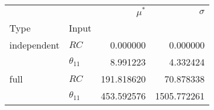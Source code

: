 \begin{tabular}{llrr}
\toprule
     &               &  $\mu^\ast$ &     $\sigma$ \\
Type & Input &             &              \\
\midrule
independent & $RC$ &    0.000000 &     0.000000 \\
     & $\theta_{11}$ &    8.991223 &     4.332424 \\
full & $RC$ &  191.818620 &    70.878338 \\
     & $\theta_{11}$ &  453.592576 &  1505.772261 \\
\bottomrule
\end{tabular}
